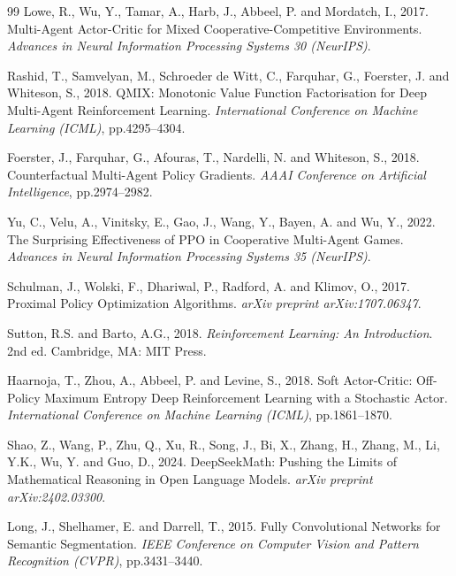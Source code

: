\begin{thebibliography}{99}
Lowe, R., Wu, Y., Tamar, A., Harb, J., Abbeel, P. and Mordatch, I., 2017.
Multi-Agent Actor-Critic for Mixed Cooperative-Competitive Environments.
\textit{Advances in Neural Information Processing Systems 30 (NeurIPS)}.

Rashid, T., Samvelyan, M., Schroeder de Witt, C., Farquhar, G., Foerster, J. and
Whiteson, S., 2018.
QMIX: Monotonic Value Function Factorisation for Deep Multi-Agent Reinforcement
Learning.
\textit{International Conference on Machine Learning (ICML)}, pp.4295--4304.

Foerster, J., Farquhar, G., Afouras, T., Nardelli, N. and Whiteson, S., 2018.
Counterfactual Multi-Agent Policy Gradients.
\textit{AAAI Conference on Artificial Intelligence}, pp.2974--2982.

Yu, C., Velu, A., Vinitsky, E., Gao, J., Wang, Y., Bayen, A. and Wu, Y., 2022.
The Surprising Effectiveness of PPO in Cooperative Multi-Agent Games.
\textit{Advances in Neural Information Processing Systems 35 (NeurIPS)}.

Schulman, J., Wolski, F., Dhariwal, P., Radford, A. and Klimov, O., 2017.
Proximal Policy Optimization Algorithms.
\textit{arXiv preprint arXiv:1707.06347}.

Sutton, R.S. and Barto, A.G., 2018.
\textit{Reinforcement Learning: An Introduction}. 2nd ed. Cambridge, MA: MIT Press.

Haarnoja, T., Zhou, A., Abbeel, P. and Levine, S., 2018.
Soft Actor-Critic: Off-Policy Maximum Entropy Deep Reinforcement Learning with a
Stochastic Actor.
\textit{International Conference on Machine Learning (ICML)}, pp.1861--1870.

Shao, Z., Wang, P., Zhu, Q., Xu, R., Song, J., Bi, X., Zhang, H., Zhang, M.,
Li, Y.K., Wu, Y. and Guo, D., 2024.
DeepSeekMath: Pushing the Limits of Mathematical Reasoning in Open Language Models.
\textit{arXiv preprint arXiv:2402.03300}.

Long, J., Shelhamer, E. and Darrell, T., 2015.
Fully Convolutional Networks for Semantic Segmentation.
\textit{IEEE Conference on Computer Vision and Pattern Recognition (CVPR)},
pp.3431--3440.


\end{thebibliography}
